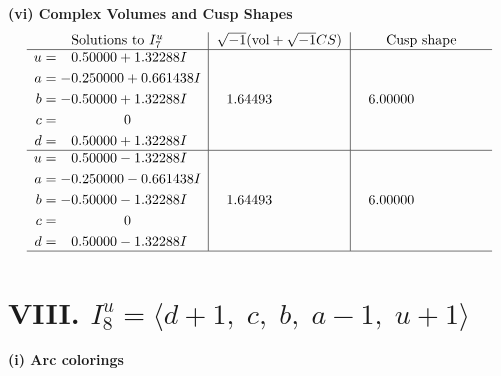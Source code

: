\documentclass[1p]{elsarticle_modified}
\theoremstyle{definition}
\newcommand{\I}{\sqrt{-1}}
\begin{document}
\newpage\flushleft \textbf{(vi) Complex Volumes and Cusp Shapes}
$$\begin{array}{c|c|c}  
\text{Solutions to }I^u_{7}& \I (\text{vol} + \sqrt{-1}CS) & \text{Cusp shape}\\
 \hline 
\begin{aligned}
u &= \phantom{-}0.50000 + 1.32288 I \\
a &= -0.250000 + 0.661438 I \\
b &= -0.50000 + 1.32288 I \\
c &= \phantom{-0.000000 } 0 \\
d &= \phantom{-}0.50000 + 1.32288 I\end{aligned}
 & \phantom{-}1.64493\phantom{ +0.000000I} & \phantom{-}6.00000\phantom{ +0.000000I} \\ \hline\begin{aligned}
u &= \phantom{-}0.50000 - 1.32288 I \\
a &= -0.250000 - 0.661438 I \\
b &= -0.50000 - 1.32288 I \\
c &= \phantom{-0.000000 } 0 \\
d &= \phantom{-}0.50000 - 1.32288 I\end{aligned}
 & \phantom{-}1.64493\phantom{ +0.000000I} & \phantom{-}6.00000\phantom{ +0.000000I}\\
 \hline 
 \end{array}$$\newpage\newpage\renewcommand{\arraystretch}{1}
\centering \section*{VIII. $I^u_{8}= \langle d+1,\;c,\;b,\;a-1,\;u+1 \rangle$}
\flushleft \textbf{(i) Arc colorings}\\
\end{document}
